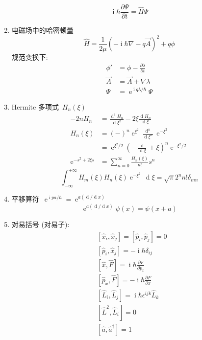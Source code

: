 \documentclass[11pt,a4paper,twocolumn,fleqn]{article}%
\DeclareMathOperator{\dif}{d}
\DeclareMathOperator{\diff}{\, d}
\DeclareMathOperator{\mi}{i}
\DeclareMathOperator{\e}{e}%
\renewcommand{\[}{~$}
\renewcommand{\]}{$~}%
\begin{document}
\begin{enumerate}
  	\begin{equation}
  	 \mi\hbar\frac{\partial \Psi}{\partial t} = \hat H\Psi
  	\end{equation}
  \item 电磁场中的哈密顿量
  	\begin{equation}
  	 \hat H = \frac{1}{2\mu}(-\mi\hbar\nabla - q\vec A)^2 + q\phi
  	\end{equation}
  	规范变换下:
  	\begin{align}
  	 \phi' &= \phi - \frac{\partial \lambda}{\partial t} \\
  	 \vec A &= \vec A + \nabla\lambda \\
  	 \Psi &= \e^{\mi q \lambda/\hbar}\Psi
  	\end{align}
  \item Hermite 多项式\[H_n(\xi)\]
  	\begin{align}
  	 -2n H_n &= \frac{\dif^2 H_n}{\dif \xi^2} - 2\xi\frac{\dif H_n}{\dif \xi} \\
  	 H_n(\xi) &= (-)^n\e^{\xi^2}\frac{\dif^n}{\dif\xi^n}\e^{-\xi^2} \\
  	  &= \e^{\xi^2/2}\left(-\frac{\dif}{\dif\xi}+\xi\right)^n\e^{-\xi^2/2} \\
  	 \e^{-s^2 + 2\xi s} &= \sum_{n=0}^{\infty} \frac{H_n(\xi)}{n!}s^n 
  	\end{align}
  	\begin{equation}
  	 \int_{-\infty}^{+\infty}H_m(\xi)H_n(\xi)\e^{-\xi^2}\diff\xi = \sqrt \pi 2^n n!\delta_{mn}
  	\end{equation}
  \item 平移算符\[\e^{\mi pa/\hbar} = \e^{a(\dif/\dif x)}\]
  	\begin{equation}
  	 \e^{a(\dif/\dif x)}\psi(x) = \psi(x+a)
  	\end{equation}
  \item 对易括号 (对易子):
  	\begin{align}
  	 &[\hat x_i , \hat x_j ] = [\hat p_i,\hat p_j] = 0\\
  	 &[\hat p_i , \hat x_j ] = -\mi\hbar \delta_{ij} \\
  	 &[\hat x, \hat F] = \mi \hbar \frac{\partial F}{\partial p_x} \\
  	 &[\hat p_x, \hat F] = -\mi\hbar \frac{\partial F}{\partial x} \\
  	 &[\hat L_i, \hat L_j] = \mi\hbar\epsilon^{ijk}\hat L_k \\
  	 &[\hat L^2 , \hat L_i] = 0 \\
  	 &[\hat a, \hat a^\dagger] =1
  	\end{align}

\end{enumerate}
\end{document}
